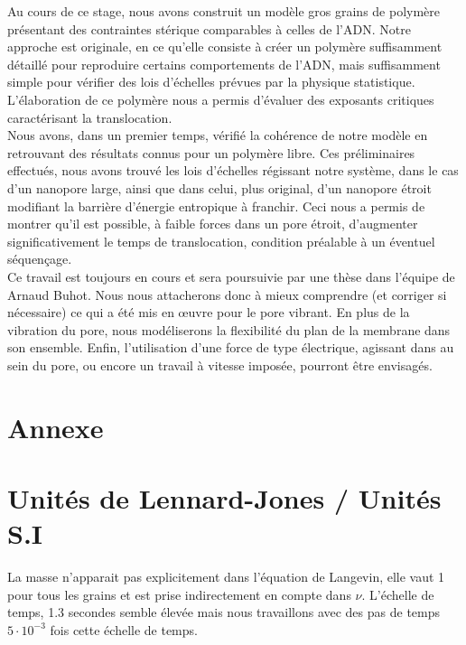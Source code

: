 \documentclass[a4paper,11pt]{article}
\begin{document}
Au cours de ce stage, nous avons construit un modèle gros grains de polymère présentant des contraintes stérique comparables à celles de l'ADN. Notre approche est originale, en ce qu'elle consiste à créer un polymère suffisamment détaillé pour reproduire certains comportements de l'ADN, mais suffisamment simple pour vérifier des lois d'échelles prévues par la physique statistique. L'élaboration de ce polymère nous a permis d'évaluer des exposants critiques caractérisant la translocation.\\

Nous avons, dans un premier temps, vérifié la cohérence de notre modèle en retrouvant des résultats connus pour un polymère libre. Ces préliminaires effectués, nous avons trouvé les lois d'échelles régissant notre système, dans le cas d'un nanopore large, ainsi que dans celui, plus original, d'un nanopore étroit modifiant la barrière d'énergie entropique à franchir. Ceci nous a permis de montrer qu'il est possible, à faible forces dans un pore étroit, d'augmenter significativement le temps de translocation, condition préalable à un éventuel séquençage.\\

Ce travail est toujours en cours et sera poursuivie par une thèse dans l'équipe de Arnaud Buhot. Nous nous attacherons donc à mieux comprendre (et corriger si nécessaire) ce qui a été mis en œuvre pour le pore vibrant. En plus de la vibration du pore, nous modéliserons la flexibilité du plan de la membrane dans son ensemble. Enfin, l'utilisation d'une force de type électrique, agissant dans au sein du pore, ou encore un travail à vitesse imposée, pourront être envisagés.







\newpage

\section{Annexe}



\section*{Unités de Lennard-Jones / Unités S.I}

La masse n'apparait pas explicitement dans l'équation de Langevin, elle vaut 1 pour tous les grains et est prise indirectement en compte dans $\nu$. L'échelle de temps, 1.3 secondes semble élevée mais nous travaillons avec des pas de temps $5\cdot 10^{-3}$ fois cette échelle de temps.
\end{document}
